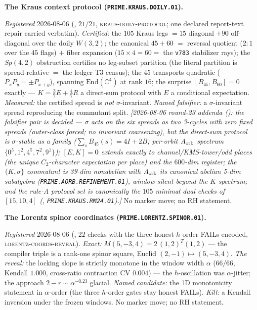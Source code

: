 \documentclass[11pt,a4paper]{article}
\begin{document}
\par\smallskip\noindent\textbf{The Kraus context protocol
(\texttt{PRIME.KRAUS.DOILY.01}).}
{\sloppy
\emph{Registered} 2026-08-06
(, $21/21$,
\textsc{kraus-doily-protocol}; one declared report-text repair
carried verbatim).  \emph{Certified:} the $105$ Kraus legs $=15$
diagonal $+90$ off-diagonal over the doily $W(3,2)$; the
canonical $45+60$ $=$ reversal quotient ($2{:}1$ over the $45$
flags) $+$ fiber expansion ($15\times4=60=$ the \texttt{v783}
stabilizer rays); the $Sp(4,2)$ obstruction certifies no
leg-subset partition (the literal partition is spread-relative
$=$ the ledger T3 census); the $45$ transports quadratic
($P_xP_y=\pm P_{x+y}$), spanning $\mathrm{End}(\mathbb C^4)$ at
rank $16$; the surprise $[B_{45},B_{60}]=0$ exactly ---
$K=\tfrac37E+\tfrac47R$ a direct-sum protocol with $E$ a
conditional expectation.  \emph{Measured:} the certified spread
is \emph{not} $\sigma$-invariant.  \emph{Named falsifier:} a
$\sigma$-invariant spread reproducing the commutant split.
\emph{[2026-08-06 round-23 addenda
(): the falsifier pair is
decided --- $\sigma$ acts on the six spreads as two 3-cycles with
\emph{zero} fixed spreads (outer-class forced; no invariant
coarsening), but the direct-sum protocol is $\sigma$-stable as a
\emph{family} ($\sum_sB_{45}(s)=4I+2B$; per-orbit $A_{\rm orb}$
spectrum $\{0^5,1^2,4^5,7^2,9^1\}$); $[E,K]=0$ extends exactly to
channel/KMS-tower/odd places (the unique $C_2$-character
expectation per place) and the $600$-dim register; the
$\{K,\sigma\}$ commutant is 39-dim nonabelian with $A_{\rm orb}$
its canonical abelian 5-dim subalgebra
(\texttt{PRIME.AORB.REFINEMENT.01}), window-silent beyond the
$K$-spectrum; and the rule-A protocol set is canonically the
$105$ minimal dual checks of $[15,10,4]$
(,
\texttt{PRIME.KRAUS.RM24.01}).]}  No
marker move; no RH statement.\par}

\par\smallskip\noindent\textbf{The Lorentz spinor coordinates
(\texttt{PRIME.LORENTZ.SPINOR.01}).}
{\sloppy
\emph{Registered} 2026-08-06
(, $22$ checks with the
three honest $h$-order FAILs encoded,
\textsc{lorentz-coords-reveal}).  \emph{Exact:}
$M(5,-3,4)=2\,(1,2)^{T}(1,2)$ --- the compiler triple is a
rank-one spinor square, Euclid $(2,-1)\mapsto(5,-3,4)$.
\emph{The reveal:} the locking slope is strictly monotone in the
window width $\alpha$ ($66/66$, Kendall $1.000$, cross-ratio
contraction CV $0.004$) --- the $h$-oscillation was
$\alpha$-jitter; the approach $2-r\sim\alpha^{-0.23}$ glacial.
\emph{Named candidate:} the 1D monotonicity statement in
$\alpha$-order (the three $h$-order gates stay honest FAILs).
\emph{Kill:} a Kendall inversion under the frozen windows.  No
marker move; no RH statement.\par}
\end{document}
